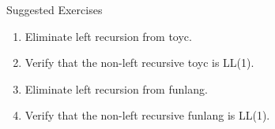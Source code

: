 \documentclass[handout]{beamer}
\begin{document}
\begin{frame}{Suggested Exercises}
    \begin{enumerate}
        \item Eliminate left recursion from toyc.
        \item Verify that the non-left recursive toyc is LL(1).
        \item Eliminate left recursion from funlang.
        \item Verify that the non-left recursive funlang is LL(1).
    \end{enumerate} 
\end{frame}
\end{document}
